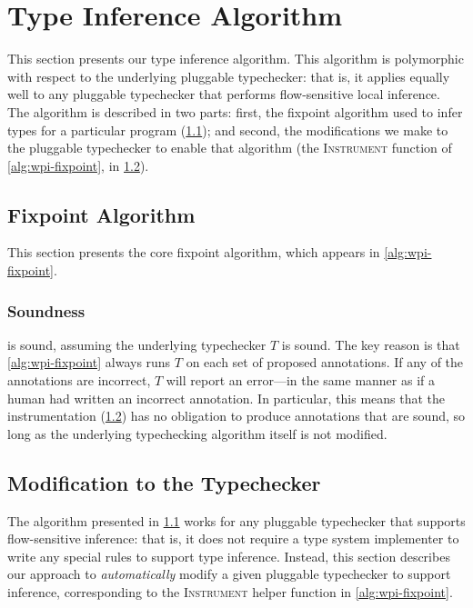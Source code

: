 \section{Type Inference Algorithm}
\label{sec:algorithm}

This section presents our type inference algorithm. This algorithm is
polymorphic with respect to the underlying pluggable typechecker: that is,
it applies equally well to any pluggable typechecker that performs flow-sensitive
local inference. The algorithm is described in two parts: first, the fixpoint
algorithm used to infer types for a particular program (\cref{sec:core-algorithm});
and second, the modifications we make to the pluggable typechecker to enable
that algorithm (\ie the \textsc{Instrument} function of \cref{alg:wpi-fixpoint},
in \cref{sec:instrument}).

\subsection{Fixpoint Algorithm}
\label{sec:core-algorithm}



This section presents the core fixpoint algorithm, which appears
in \cref{alg:wpi-fixpoint}.


\subsubsection{Soundness}
\label{sec:soundness}

 is sound, assuming the underlying typechecker $T$
is sound. The key reason is that \cref{alg:wpi-fixpoint} always runs $T$
on each set of proposed annotations. If any of the annotations are incorrect,
$T$ will report an error---in the same manner as if a human had written an
incorrect annotation. In particular, this means that the instrumentation
(\cref{sec:instrument}) has no obligation to produce annotations that are sound,
so long as the underlying typechecking algorithm itself is not modified.

\subsection{Modification to the Typechecker}
\label{sec:instrument}

The algorithm presented in \cref{sec:core-algorithm} works for
any pluggable typechecker that supports flow-sensitive inference:
that is, it does not require a type system implementer to write
any special rules to support type inference. Instead, this section
describes our approach to \emph{automatically} modify a given
pluggable typechecker to support inference, corresponding to the
\textsc{Instrument} helper function in \cref{alg:wpi-fixpoint}.

